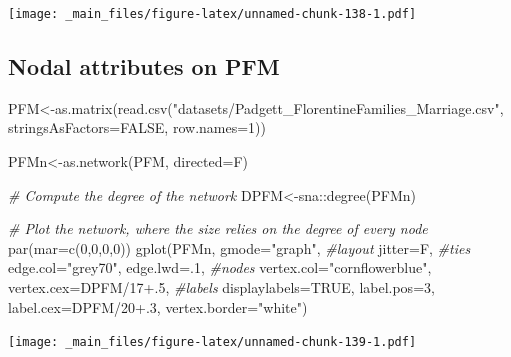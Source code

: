 \documentclass[
  notitlepage,
  onecolumn,
  openany]{book}
\newenvironment{Shaded}{\begin{snugshade}}{\end{snugshade}}
\newcommand{\AttributeTok}[1]{\textcolor[rgb]{0.77,0.63,0.00}{#1}}
\newcommand{\CommentTok}[1]{\textcolor[rgb]{0.56,0.35,0.01}{\textit{#1}}}
\newcommand{\ConstantTok}[1]{\textcolor[rgb]{0.00,0.00,0.00}{#1}}
\newcommand{\DecValTok}[1]{\textcolor[rgb]{0.00,0.00,0.81}{#1}}
\newcommand{\FloatTok}[1]{\textcolor[rgb]{0.00,0.00,0.81}{#1}}
\newcommand{\FunctionTok}[1]{\textcolor[rgb]{0.00,0.00,0.00}{#1}}
\newcommand{\NormalTok}[1]{#1}
\newcommand{\OtherTok}[1]{\textcolor[rgb]{0.56,0.35,0.01}{#1}}
\newcommand{\SpecialCharTok}[1]{\textcolor[rgb]{0.00,0.00,0.00}{#1}}
\newcommand{\StringTok}[1]{\textcolor[rgb]{0.31,0.60,0.02}{#1}}
\begin{document}
\texttt{[image: \_main\_files/figure-latex/unnamed-chunk-138-1.pdf]}

\hypertarget{nodal-attributes-on-pfm}{%
\subsection{Nodal attributes on PFM}\label{nodal-attributes-on-pfm}}

\begin{Shaded}
\begin{Highlighting}[]
\NormalTok{PFM}\OtherTok{\textless{}{-}}\FunctionTok{as.matrix}\NormalTok{(}\FunctionTok{read.csv}\NormalTok{(}\StringTok{"datasets/Padgett\_FlorentineFamilies\_Marriage.csv"}\NormalTok{,}
                        \AttributeTok{stringsAsFactors=}\ConstantTok{FALSE}\NormalTok{, }\AttributeTok{row.names=}\DecValTok{1}\NormalTok{))}

\NormalTok{PFMn}\OtherTok{\textless{}{-}}\FunctionTok{as.network}\NormalTok{(PFM, }\AttributeTok{directed=}\NormalTok{F)}

\CommentTok{\# Compute the degree of the network}
\NormalTok{DPFM}\OtherTok{\textless{}{-}}\NormalTok{sna}\SpecialCharTok{::}\FunctionTok{degree}\NormalTok{(PFMn)}

\CommentTok{\# Plot the network, where the size relies on the degree of every node}
\FunctionTok{par}\NormalTok{(}\AttributeTok{mar=}\FunctionTok{c}\NormalTok{(}\DecValTok{0}\NormalTok{,}\DecValTok{0}\NormalTok{,}\DecValTok{0}\NormalTok{,}\DecValTok{0}\NormalTok{))}
\FunctionTok{gplot}\NormalTok{(PFMn, }
      \AttributeTok{gmode=}\StringTok{"graph"}\NormalTok{, }
      \CommentTok{\#layout}
      \AttributeTok{jitter=}\NormalTok{F,}
      \CommentTok{\#ties}
      \AttributeTok{edge.col=}\StringTok{"grey70"}\NormalTok{,}
      \AttributeTok{edge.lwd=}\NormalTok{.}\DecValTok{1}\NormalTok{, }
      \CommentTok{\#nodes}
      \AttributeTok{vertex.col=}\StringTok{"cornflowerblue"}\NormalTok{,}
      \AttributeTok{vertex.cex=}\NormalTok{DPFM}\SpecialCharTok{/}\DecValTok{17}\FloatTok{+.5}\NormalTok{,}
      \CommentTok{\#labels}
      \AttributeTok{displaylabels=}\ConstantTok{TRUE}\NormalTok{, }
      \AttributeTok{label.pos=}\DecValTok{3}\NormalTok{, }
      \AttributeTok{label.cex=}\NormalTok{DPFM}\SpecialCharTok{/}\DecValTok{20}\FloatTok{+.3}\NormalTok{, }
      \AttributeTok{vertex.border=}\StringTok{"white"}\NormalTok{)}
\end{Highlighting}
\end{Shaded}

\texttt{[image: \_main\_files/figure-latex/unnamed-chunk-139-1.pdf]}
\end{document}
